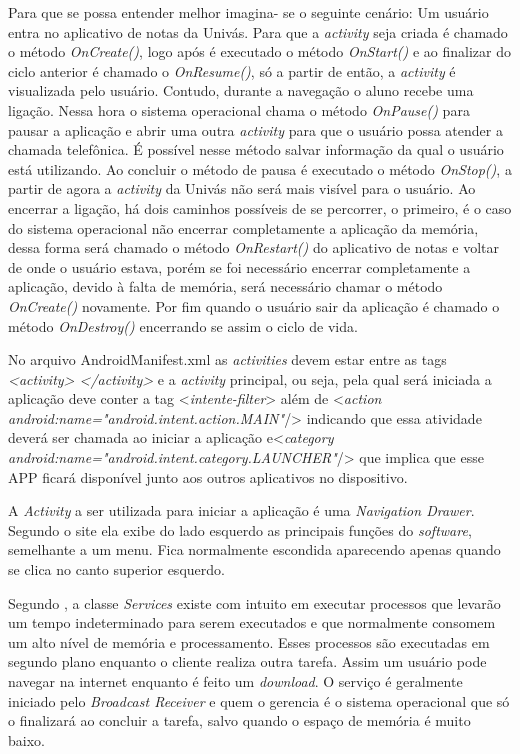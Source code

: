	\par Para que se possa entender melhor imagina- se o
seguinte cenário: Um usuário entra no aplicativo de notas da Univás. Para que a
\textit{activity} seja criada é chamado o método \textit{OnCreate()}, logo após
é executado o método \textit{OnStart()} e ao finalizar do ciclo anterior é
chamado o \textit{OnResume()}, só a partir de então, a \textit{activity} é
visualizada pelo usuário. Contudo, durante a navegação o aluno recebe uma
ligação. Nessa hora o sistema operacional chama o método \textit{OnPause()}
para pausar a aplicação e abrir uma outra \textit{activity} para que o usuário
possa atender a chamada telefônica. É possível nesse método salvar informação
da qual o usuário está utilizando. Ao concluir o método de pausa é executado o
método \textit{OnStop()}, a partir de agora a \textit{activity} da Univás não
será mais visível para o usuário. Ao encerrar a ligação, há dois caminhos
possíveis de se percorrer, o primeiro, é o caso do sistema operacional não
encerrar completamente a aplicação da memória, dessa forma será chamado o
método \textit{OnRestart()} do aplicativo de notas e voltar de onde o usuário
estava, porém se foi necessário encerrar completamente a aplicação, devido à
falta de memória, será necessário chamar o método \textit{OnCreate()}
novamente. Por fim quando o usuário sair da aplicação é chamado o método
\textit{OnDestroy()} encerrando se assim o ciclo de vida.

	\par No arquivo AndroidManifest.xml as \textit{activities} devem estar entre as
tags \textit{<activity> </activity>} e a \textit{activity} principal, ou seja,
pela qual será iniciada a aplicação deve conter a tag <\textit{intente-filter}>
além de <\textit{action android:name="android.intent.action.MAIN"}/> indicando
que essa atividade deverá ser chamada ao iniciar a aplicação e\linebreak[4]
<\textit{category android:name="android.intent.category.LAUNCHER"}/> que
implica que esse APP ficará disponível junto aos outros aplicativos no
dispositivo.

	\par A \textit{Activity} a ser utilizada para iniciar a aplicação é uma
\textit{Navigation Drawer}. Segundo o site  ela exibe
do lado esquerdo as principais funções do \textit{software}, semelhante a um
menu. Fica normalmente escondida aparecendo apenas quando se clica no canto
superior esquerdo.

	\par Segundo , a classe \textit{Services} existe
com intuito em executar processos que levarão um tempo indeterminado para serem
executados e que normalmente consomem um alto nível de memória e processamento.
Esses processos são executadas em segundo plano enquanto o cliente realiza
outra tarefa. Assim um usuário pode navegar na internet enquanto é feito um
\textit{download}. O serviço é geralmente iniciado pelo \textit{Broadcast
Receiver} e quem o gerencia é o sistema operacional que só o finalizará ao
concluir a tarefa, salvo quando o espaço de memória é muito baixo.

